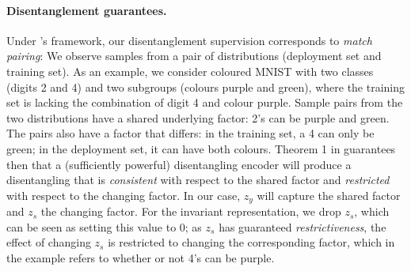 \paragraph{Disentanglement guarantees.}
%
%
%
Under \citet{ShuCheKumErmetal20}'s framework, our disentanglement supervision corresponds to \emph{match pairing}:
We observe samples from a pair of distributions (deployment set and training set).
As an example, we consider coloured MNIST with two classes (digits 2 and 4) and two subgroups (colours purple and green), where the training set is lacking the combination of digit 4 and colour purple.
Sample pairs from the two distributions have a shared underlying factor: 2's can be purple and green.
The pairs also have a factor that differs: in the training set, a 4 can only be green; in the deployment set, it can have both colours.
Theorem 1 in \citep{ShuCheKumErmetal20} guarantees then that a (sufficiently powerful) disentangling encoder will produce a disentangling that is \emph{consistent} with respect to the shared factor and \emph{restricted} with respect to the changing factor.
In our case, $z_y$ will capture the shared factor and $z_s$ the changing factor.
For the invariant representation, we drop $z_s$, which can be seen as setting this value to 0; as $z_s$ has guaranteed \emph{restrictiveness}, the effect of changing $z_s$ is restricted to changing the corresponding factor,
which in the example refers to whether or not 4's can be purple.
%
%
%

